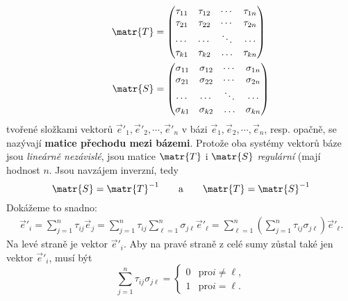       \begin{gather*}
        \begin{aligned}
          \matr{T} &= 
            \begin{pmatrix}
              \tau_{11} & \tau_{12} & \cdots & \tau_{1n}    \\
              \tau_{21} & \tau_{22} & \cdots & \tau_{2n}    \\
              \cdots    & \cdots    & \ddots & \cdots       \\
              \tau_{k1} & \tau_{k2} & \ldots & \tau_{kn}
            \end{pmatrix}           \\
          \qquad \matr{S} &=
          \begin{pmatrix}
            \sigma_{11} & \sigma_{12} & \cdots & \sigma_{1n}    \\
            \sigma_{21} & \sigma_{22} & \cdots & \sigma_{2n}    \\
            \cdots      & \cdots      & \ddots & \cdots         \\
            \sigma_{k1} & \sigma_{k2} & \ldots & \sigma_{kn}
          \end{pmatrix}
        \end{aligned}  
      \end{gather*}    
      tvořené složkami vektorů \(\vec{e}'_1, \vec{e}'_2, \cdots, \vec{e}'_n\) v bázi \(\vec{e}_1,
      \vec{e}_2, \cdots, \vec{e}_n\), resp. opačně, se nazývají \textbf{matice přechodu mezi
      bázemi}. Protože oba systémy vektorů báze jsou \emph{lineárně nezávislé}, jsou matice
      \(\matr{T}\) i \(\matr{S}\) \emph{regulární} (mají hodnost \(n\). Jsou navzájem inverzní, tedy
      \begin{equation*}
        \matr{S} = \matr{T}^{-1} \qquad \text{a} \qquad \matr{T} = \matr{S}^{-1}
      \end{equation*}
      Dokážeme to snadno:
      \begin{gather*}
        \vec{e}'_i = \sum_{j=1}^n\tau_{ij}\vec{e}_j 
                   = \sum_{j=1}^n\tau_{ij}\sum_{\ell=1}^n\sigma_{j\ell}\vec{e}'_\ell
                   = \sum_{\ell=1}^n\left(\sum_{j=1}^n\tau_{ij}\sigma_{j\ell}\right)\vec{e}'_\ell.
      \end{gather*} 
      Na levé straně je vektor \(\vec{e}'_i\). Aby na pravé straně z celé sumy zůstal také jen
      vektor \(\vec{e}'_i\), musí být
      \begin{equation*}
        \sum_{j=1}^n\tau_{ij}\sigma_{j\ell} = 
        \begin{cases}
          0 & \text{pro} i \neq \ell, \\
          1 & \text{pro} i = \ell.
        \end{cases}
      \end{equation*}
